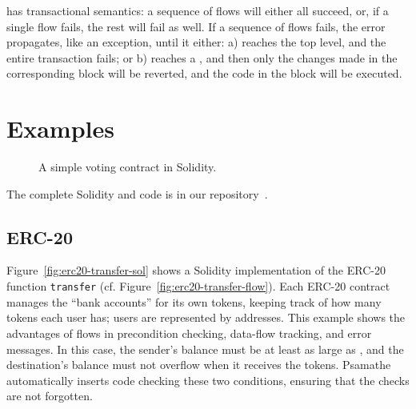 \documentclass[nonacm, dvipsnames, sigconf]{acmart}
\begin{document}

\langName has transactional semantics: a sequence of flows will either all succeed, or, if a single flow fails, the rest will fail as well.
If a sequence of flows fails, the error propagates, like an exception, until it either: a) reaches the top level, and the entire transaction fails; or b) reaches a , and then only the changes made in the corresponding  block will be reverted, and the code in the  block will be executed.

\section{Examples}
\begin{figure}
    \centering
    
    \vspace{-1em}
    \caption{A simple voting contract in Solidity.}
    \label{fig:voting-impl-sol}
\end{figure}
The complete Solidity and \langName code is in our repository~\cite{psamatheRepo}.

\subsection{ERC-20}\label{sec:erc20-impl}
Figure~\ref{fig:erc20-transfer-sol} shows a Solidity implementation of the ERC-20 function \lstinline{transfer} (cf. Figure~\ref{fig:erc20-transfer-flow}).
Each ERC-20 contract manages the ``bank accounts'' for its own tokens, keeping track of how many tokens each user has; users are represented by addresses.
This example shows the advantages of flows in precondition checking, data-flow tracking, and error messages.
In this case, the sender's balance must be at least as large as , and the destination's balance must not overflow when it receives the tokens.
Psamathe automatically inserts code checking these two conditions, ensuring that the checks are not forgotten.

\end{document}
